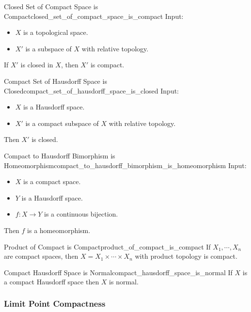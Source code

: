\documentclass{article}
\begin{document}
\begin{theorem}{Closed Set of Compact Space is Compact}{closed_set_of_compact_space_is_compact}
    Input:
    \begin{itemize}
        \item $X$ is a topological space.
        \item $X'$ is a subspace of $X$ with relative topology.
    \end{itemize}
    If $X'$ is closed in $X$, then $X'$ is compact.
\end{theorem}

\begin{theorem}{Compact Set of Hausdorff Space is Closed}{compact_set_of_hausdorff_space_is_closed}
    Input:
    \begin{itemize}
        \item $X$ is a Hausdorff space.
        \item $X'$ is a compact subspace of $X$ with relative topology.
    \end{itemize}
    Then $X'$ is closed.
\end{theorem}

\begin{theorem}{Compact to Hausdorff Bimorphism is Homeomorphism}{compact_to_hausdorff_bimorphism_is_homeomorphism}
    Input:
    \begin{itemize}
        \item $X$ is a compact space.
        \item $Y$ is a Hausdorff space.
        \item $f:X\rightarrow Y$ is a continuous bijection.
    \end{itemize}
    Then $f$ is a homeomorphism.
\end{theorem}

\begin{theorem}{Product of Compact is Compact}{product_of_compact_is_compact}
    If $X_1,\cdots,X_n$ are compact spaces, then $X = X_1 \times \cdots \times X_n$ with product topology is compact.
\end{theorem}

\begin{theorem}{Compact Hausdorff Space is Normal}{compact_hausdorff_space_is_normal}
    If $X$ is a compact Hausdorff space then $X$ is normal.
\end{theorem}

\subsubsection{Limit Point Compactness}
\end{document}
